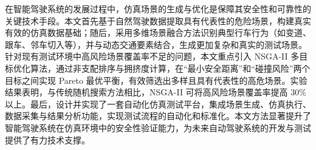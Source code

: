 \begin{abstractzh}

在智能驾驶系统的发展过程中，仿真场景的生成与优化是保障其安全性和可靠性的关键技术手段。本文首先基于自然驾驶数据提取具有代表性的危险场景，构建真实有效的仿真数据基础；随后，采用多维场景融合方法识别典型行车行为（如变道、跟车、邻车切入等），并与动态交通要素结合，生成更加复杂和真实的测试场景。针对现有测试环境中高风险场景覆盖率不足的问题，本文重点引入 NSGA-II 多目标优化算法，通过非支配排序与拥挤度计算，在“最小安全距离”和“碰撞风险”两个目标之间实现 Pareto 最优平衡，有效筛选出多样且具有代表性的高危场景。实验结果表明，与传统随机搜索方法相比，NSGA-II 可将高风险场景覆盖率提高 30\% 以上。最后，设计并实现了一套自动化仿真测试平台，集成场景生成、仿真执行、数据采集与结果分析功能，实现测试流程的自动化和标准化。本文方法显著提升了智能驾驶系统在仿真环境中的安全性验证能力，为未来自动驾驶系统的开发与测试提供了有力技术支撑。


\end{abstractzh}
